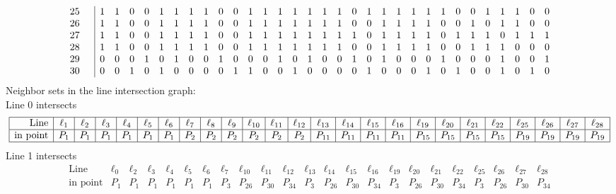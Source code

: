 \documentclass{article}
\begin{document}
{{$$\begin{array}{rr|*{31}r}
25 &  & 1 & 1 & 0 & 0 & 1 & 1 & 1 & 1 & 0 & 0 & 1 & 1 & 1 & 1 & 1 & 1 & 1 & 0 & 1 & 1 & 1 & 1 & 1 & 1 & 0 & 0 & 1 & 1 & 1 & 0 & 0\\
26 &  & 1 & 1 & 0 & 0 & 1 & 1 & 1 & 1 & 0 & 0 & 1 & 1 & 1 & 1 & 1 & 1 & 1 & 0 & 0 & 1 & 1 & 1 & 1 & 0 & 0 & 1 & 0 & 1 & 1 & 0 & 0\\
27 &  & 1 & 1 & 0 & 0 & 1 & 1 & 1 & 1 & 0 & 0 & 1 & 1 & 1 & 1 & 1 & 1 & 1 & 1 & 0 & 1 & 1 & 1 & 1 & 0 & 1 & 1 & 1 & 0 & 1 & 1 & 1\\
28 &  & 1 & 1 & 0 & 0 & 1 & 1 & 1 & 1 & 0 & 0 & 1 & 1 & 1 & 1 & 1 & 1 & 1 & 0 & 0 & 1 & 1 & 1 & 1 & 0 & 0 & 1 & 1 & 1 & 0 & 0 & 0\\
29 &  & 0 & 0 & 0 & 1 & 0 & 1 & 0 & 0 & 1 & 0 & 0 & 0 & 1 & 0 & 1 & 0 & 0 & 1 & 0 & 1 & 0 & 0 & 0 & 1 & 0 & 0 & 0 & 1 & 0 & 0 & 1\\
30 &  & 0 & 0 & 1 & 0 & 1 & 0 & 0 & 0 & 0 & 1 & 1 & 0 & 0 & 1 & 0 & 0 & 0 & 0 & 1 & 0 & 0 & 0 & 1 & 0 & 1 & 0 & 0 & 1 & 0 & 1 & 0\\
\end{array}
$$
}%
Neighbor sets in the line intersection graph:\\
Line 0 intersects 
$$
\begin{array}{|r*{24}{|c}|}
\hline
\mbox{Line}  & \ell_{1} & \ell_{2} & \ell_{3} & \ell_{4} & \ell_{5} & \ell_{6} & \ell_{7} & \ell_{8} & \ell_{9} & \ell_{10} & \ell_{11} & \ell_{12} & \ell_{13} & \ell_{14} & \ell_{15} & \ell_{16} & \ell_{19} & \ell_{20} & \ell_{21} & \ell_{22} & \ell_{25} & \ell_{26} & \ell_{27} & \ell_{28}\\
\hline
\mbox{in point}  & P_{1} & P_{1} & P_{1} & P_{1} & P_{1} & P_{1} & P_{2} & P_{2} & P_{2} & P_{2} & P_{2} & P_{2} & P_{11} & P_{11} & P_{11} & P_{11} & P_{15} & P_{15} & P_{15} & P_{15} & P_{19} & P_{19} & P_{19} & P_{19}\\
\hline
\end{array}
$$
Line 1 intersects 
$$
\begin{array}{|r*{22}{|c}|}
\hline
\mbox{Line}  & \ell_{0} & \ell_{2} & \ell_{3} & \ell_{4} & \ell_{5} & \ell_{6} & \ell_{7} & \ell_{10} & \ell_{11} & \ell_{12} & \ell_{13} & \ell_{14} & \ell_{15} & \ell_{16} & \ell_{19} & \ell_{20} & \ell_{21} & \ell_{22} & \ell_{25} & \ell_{26} & \ell_{27} & \ell_{28}\\
\hline
\mbox{in point}  & P_{1} & P_{1} & P_{1} & P_{1} & P_{1} & P_{1} & P_{3} & P_{26} & P_{30} & P_{34} & P_{3} & P_{26} & P_{30} & P_{34} & P_{3} & P_{26} & P_{30} & P_{34} & P_{3} & P_{26} & P_{30} & P_{34}\\

\end{array}$$}
\end{document}
